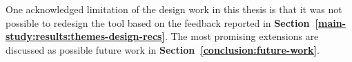 One acknowledged limitation of the design work in this thesis is that it was not possible to redesign the tool based on the feedback reported in \textbf{Section~\ref{main-study:results:themes-design-recs}}.  The most promising extensions are discussed as possible future work in \textbf{Section~\ref{conclusion:future-work}}.








